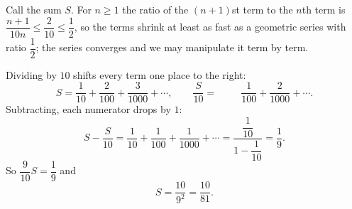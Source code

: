 Call the sum $S$. For $n\ge1$ the ratio of the $(n+1)$st term to the $n$th term is $\dfrac{n+1}{10n}\le\dfrac{2}{10}\le\dfrac{1}{2}$, so the terms shrink at least as fast as a geometric series with ratio $\dfrac{1}{2}$; the series converges and we may manipulate it term by term.

Dividing by $10$ shifts every term one place to the right:
\[S=\dfrac{1}{10}+\dfrac{2}{100}+\dfrac{3}{1000}+\cdots,\qquad \dfrac{S}{10}=\phantom{\dfrac{1}{10}+{}}\dfrac{1}{100}+\dfrac{2}{1000}+\cdots.\]
Subtracting, each numerator drops by $1$:
\[S-\dfrac{S}{10}=\dfrac{1}{10}+\dfrac{1}{100}+\dfrac{1}{1000}+\cdots=\dfrac{\dfrac{1}{10}}{1-\dfrac{1}{10}}=\dfrac{1}{9}.\]
So $\dfrac{9}{10}S=\dfrac{1}{9}$ and
\[S=\dfrac{10}{9^2}=\boxed{\dfrac{10}{81}}.\]
